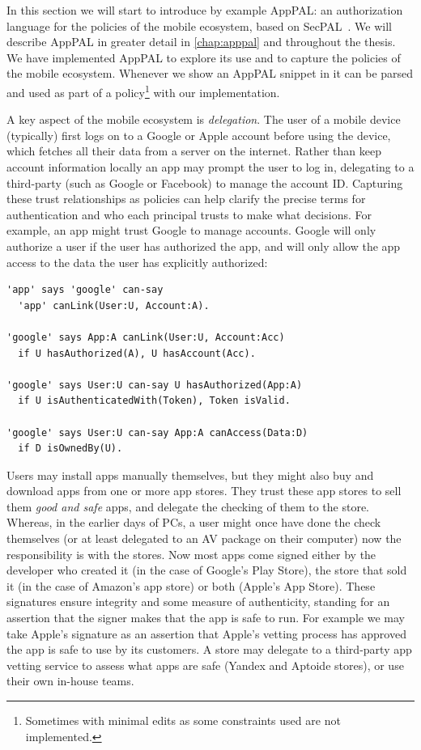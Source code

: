 \documentclass[thesis.tex]{subfiles}
\begin{document}
In this section we will start to introduce by example AppPAL: an authorization
language for the policies of the mobile ecosystem, based on
SecPAL~\cite{becker_secpal:_2006}. We will describe AppPAL in greater detail in
\autoref{chap:apppal} and throughout the thesis. We have implemented AppPAL to
explore its use and to capture the
policies of the mobile ecosystem. Whenever we show an AppPAL snippet in
 it can be parsed and used as part of a
policy\footnote{Sometimes with minimal edits as some constraints used are not
implemented.} with our implementation.

A key aspect of the mobile ecosystem is \emph{delegation}. The user of a mobile
device (typically) first logs on to a Google or Apple account before using the
device, which fetches all their data from a server on the internet. Rather than
keep account information locally an app may prompt the user to log in,
delegating to a third-party (such as Google or Facebook) to manage the account
ID. Capturing these trust relationships as policies can help clarify the precise
terms for authentication and who each principal trusts to make what decisions.
For example, an app might trust Google to manage accounts. Google will only
authorize a user if the user has authorized the app, and will only allow the app
access to the data the user has explicitly authorized:

\begin{lstlisting}
'app' says 'google' can-say 
  'app' canLink(User:U, Account:A).

'google' says App:A canLink(User:U, Account:Acc)
  if U hasAuthorized(A), U hasAccount(Acc).

'google' says User:U can-say U hasAuthorized(App:A)
  if U isAuthenticatedWith(Token), Token isValid.

'google' says User:U can-say App:A canAccess(Data:D)
  if D isOwnedBy(U).
\end{lstlisting}

Users may install apps manually themselves, but they might also buy and download
apps from one or more app stores. They trust these app stores to sell them
\emph{good and safe} apps, and delegate the checking of them to the store.
Whereas, in the earlier days of PCs, a user might once have done the check
themselves (or at least delegated to an \ac{AV} package on their computer) now
the responsibility is with the stores. Now most apps come signed either by the
developer who created it (in the case of Google's Play Store), the store that
sold it (in the case of Amazon's app store) or both (Apple's App Store). These
signatures ensure integrity and some measure of authenticity, standing for an
assertion that the signer makes that the app is safe to run. For example we may
take Apple's signature as an assertion that Apple's vetting process has approved
the app is safe to use by its customers. A store may delegate to a third-party
app vetting service to assess what apps are safe (Yandex and Aptoide stores), or
use their own in-house teams.
\end{document}
